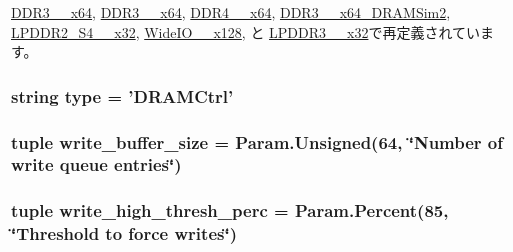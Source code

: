 \hyperlink{classDRAMCtrl_1_1DDR3__1600__x64_a94c112e585153e09e803751da3cfafcd}{DDR3\_\_\-x64}, \hyperlink{classDRAMCtrl_1_1DDR3__2133__x64_a94c112e585153e09e803751da3cfafcd}{DDR3\_\_\-x64}, \hyperlink{classDRAMCtrl_1_1DDR4__2400__x64_a94c112e585153e09e803751da3cfafcd}{DDR4\_\_\-x64}, \hyperlink{classDRAMCtrl_1_1DDR3__1333__x64__DRAMSim2_a94c112e585153e09e803751da3cfafcd}{DDR3\_\_\-x64\_\-DRAMSim2}, \hyperlink{classDRAMCtrl_1_1LPDDR2__S4__1066__x32_a94c112e585153e09e803751da3cfafcd}{LPDDR2\_\-S4\_\_\-x32}, \hyperlink{classDRAMCtrl_1_1WideIO__200__x128_a94c112e585153e09e803751da3cfafcd}{WideIO\_\_\-x128}, と \hyperlink{classDRAMCtrl_1_1LPDDR3__1600__x32_a94c112e585153e09e803751da3cfafcd}{LPDDR3\_\_\-x32}で再定義されています。\hypertarget{classDRAMCtrl_1_1DRAMCtrl_acce15679d830831b0bbe8ebc2a60b2ca}{
\subsubsection[{type}]{\setlength{\rightskip}{0pt plus 5cm}string {\bf type} = '{\bf DRAMCtrl}'}}
\label{classDRAMCtrl_1_1DRAMCtrl_acce15679d830831b0bbe8ebc2a60b2ca}
\hypertarget{classDRAMCtrl_1_1DRAMCtrl_afcd1312043c865c85b8db72167b6eccf}{
\subsubsection[{write\_\-buffer\_\-size}]{\setlength{\rightskip}{0pt plus 5cm}tuple {\bf write\_\-buffer\_\-size} = Param.Unsigned(64, \char`\"{}Number of write queue entries\char`\"{})}}
\label{classDRAMCtrl_1_1DRAMCtrl_afcd1312043c865c85b8db72167b6eccf}
\hypertarget{classDRAMCtrl_1_1DRAMCtrl_a085a7db2cf6b40fb8b91f5a312776d99}{
\subsubsection[{write\_\-high\_\-thresh\_\-perc}]{\setlength{\rightskip}{0pt plus 5cm}tuple {\bf write\_\-high\_\-thresh\_\-perc} = Param.Percent(85, \char`\"{}Threshold to force writes\char`\"{})}}
